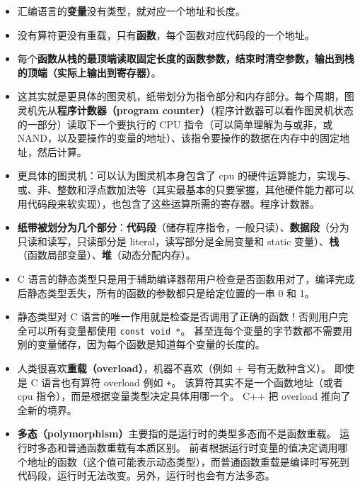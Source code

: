 \begin{itemize}
\item 汇编语言的\textbf{变量}没有类型，就对应一个地址和长度。
\item 没有算符更没有重载，只有\textbf{函数}，每个函数对应代码段的一个地址。
\item 每个\textbf{函数从栈的最顶端读取固定长度的函数参数，结束时清空参数，输出到栈的顶端（实际上输出到寄存器）}。
\item 这其实就是更具体的图灵机，纸带划分为指令部分和内存部分。每个周期，图灵机先从\textbf{程序计数器（program counter）}（程序计数器可以看作图灵机状态的一部分）读取下一个要执行的 CPU 指令（可以简单理解为与或非，或 NAND，以及要操作的变量的地址）、该指令要操作的数据在内存中的固定地址，然后计算。
\item 更具体的图灵机：可以认为图灵机本身包含了 cpu 的硬件运算能力，实现与、或、非、整数和浮点数加法等（其实最基本的只要掌握，其他硬件能力都可以用代码段来软实现），也包含了这些运算所需的寄存器。程序计数器。
\item \textbf{纸带被划分为几个部分}：\textbf{代码段}（储存程序指令，一般只读）、\textbf{数据段}（分为只读和读写，只读部分是 literal，读写部分是全局变量和 static 变量）、\textbf{栈}（函数局部变量）、\textbf{堆}（动态分配内存）。
\item C 语言的静态类型只是用于辅助编译器帮用户检查是否函数用对了，编译完成后静态类型丢失，所有的函数的参数都只是给定位置的一串 0 和 1。
\item 静态类型对 C 语言的唯一作用就是检查是否调用了正确的函数！否则用户完全可以所有变量都使用 \verb`const void *`。 甚至连每个变量的字节数都不需要用别的变量储存，因为每个函数是知道每个变量的长度的。
\item 人类很喜欢\textbf{重载（overload）}，机器不喜欢（例如 + 号有无数种含义）。 即使是 C 语言也有算符 overload 例如 \verb`+`。 该算符其实不是一个函数地址（或者 cpu 指令），而是根据变量类型决定具体用哪一个。 C++ 把 overload 推向了全新的境界。
\item \textbf{多态（polymorphism）}主要指的是运行时的类型多态而不是函数重载。 运行时多态和普通函数重载有本质区别。 前者根据运行时变量的值决定调用哪个地址的函数（这个值可能表示动态类型），而普通函数重载是编译时写死到代码段，运行时无法改变。另外，运行时也会有方法多态。
\end{itemize}
